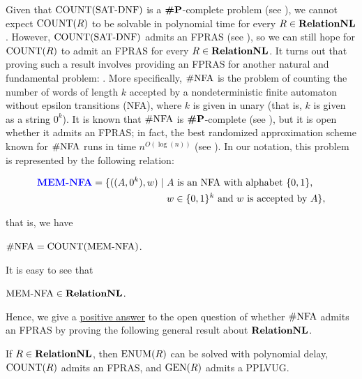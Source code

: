 \documentclass[11pt,twoside=off,numbers=noenddot]{scrbook}
\begin{document}
Given that $\text{COUNT}(\text{SAT-DNF})$ is a $\textbf{\#P}$-complete problem (see \cite{provan1983complexity}), we cannot expect $\text{COUNT}(R)$ to be solvable in polynomial time for every $R \in \textbf{RelationNL}$. However, $\text{COUNT}(\text{SAT-DNF})$ admits an FPRAS (see \cite{karp1983monte}), so we can still hope for $\text{COUNT}(R)$ to admit an FPRAS for every $R \in \textbf{RelationNL}$. It turns out that proving such a result involves providing an FPRAS for another natural and fundamental problem: \vocab{$\SharpNFA$}. More specifically, $\SharpNFA$ is the problem of counting the number of words of length $k$ accepted by a nondeterministic finite automaton without epsilon transitions (NFA), where $k$ is given in unary (that is, $k$ is given as a string $0^k$). It is known that $\SharpNFA$ is $\textbf{\#P}$-complete (see \cite{alvarez1993very}), but it is open whether it admits an FPRAS; in fact, the best randomized approximation scheme known for $\SharpNFA$ runs in time $n^{O(\log(n))}$ (see \cite{kannan1995counting}). In our notation, this problem is represented by the following relation:

\begin{definition}[$\MEMNFA$]
    \begin{align*}
        \textbf{\color{blue} \text{MEM-NFA}} = \{((A, 0^k), w) \mid & \ \text{$A$ is an NFA with alphabet $\{ 0, 1 \}$,}          \\
                                               & \ \text{$w \in \{ 0, 1 \}^k$ and $w$ is accepted by $A$}\},
    \end{align*}
\end{definition} 

that is, we have

\begin{definition}[$\SharpNFA$]
    $\text{\#NFA} = \text{COUNT}(\text{MEM-NFA})$.
\end{definition}

It is easy to see that

\begin{lemma}
    $\text{MEM-NFA} \in \textbf{RelationNL}$.
\end{lemma}

\begin{moral}
    Hence, we give a \ul{positive answer} to the open question of whether $\SharpNFA$ admits an FPRAS by proving the following general result about $\textbf{RelationNL}$.
\end{moral}

\begin{theorem}
    If $R \in \textbf{RelationNL}$, then $\text{ENUM}(R)$ can be solved with polynomial delay, $\text{COUNT}(R)$ admits an FPRAS, and $\text{GEN}(R)$ admits a PPLVUG.
\end{theorem}
\end{document}
